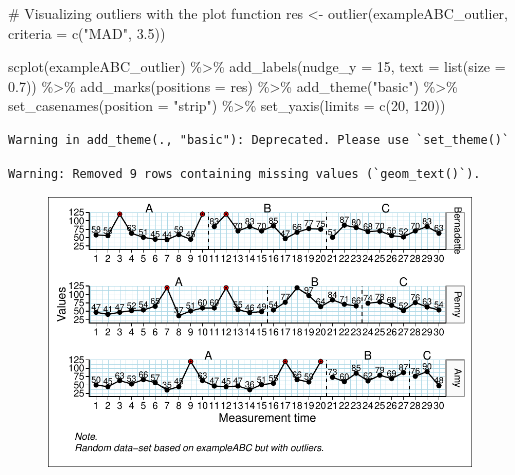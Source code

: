 \documentclass[
  letterpaper,
  DIV=11,
  numbers=noendperiod]{scrreprt}
\newenvironment{Shaded}{\begin{snugshade}}{\end{snugshade}}
\newcommand{\AttributeTok}[1]{\textcolor[rgb]{0.40,0.45,0.13}{#1}}
\newcommand{\CommentTok}[1]{\textcolor[rgb]{0.37,0.37,0.37}{#1}}
\newcommand{\DecValTok}[1]{\textcolor[rgb]{0.68,0.00,0.00}{#1}}
\newcommand{\FloatTok}[1]{\textcolor[rgb]{0.68,0.00,0.00}{#1}}
\newcommand{\FunctionTok}[1]{\textcolor[rgb]{0.28,0.35,0.67}{#1}}
\newcommand{\NormalTok}[1]{\textcolor[rgb]{0.00,0.23,0.31}{#1}}
\newcommand{\OtherTok}[1]{\textcolor[rgb]{0.00,0.23,0.31}{#1}}
\newcommand{\SpecialCharTok}[1]{\textcolor[rgb]{0.37,0.37,0.37}{#1}}
\newcommand{\StringTok}[1]{\textcolor[rgb]{0.13,0.47,0.30}{#1}}
\begin{document}
\begin{Shaded}
\begin{Highlighting}[]
\CommentTok{\# Visualizing outliers with the plot function}
\NormalTok{res }\OtherTok{\textless{}{-}} \FunctionTok{outlier}\NormalTok{(exampleABC\_outlier, }\AttributeTok{criteria =} \FunctionTok{c}\NormalTok{(}\StringTok{"MAD"}\NormalTok{, }\FloatTok{3.5}\NormalTok{))}

\FunctionTok{scplot}\NormalTok{(exampleABC\_outlier) }\SpecialCharTok{\%\textgreater{}\%}
  \FunctionTok{add\_labels}\NormalTok{(}\AttributeTok{nudge\_y =} \DecValTok{15}\NormalTok{, }\AttributeTok{text =} \FunctionTok{list}\NormalTok{(}\AttributeTok{size =} \FloatTok{0.7}\NormalTok{)) }\SpecialCharTok{\%\textgreater{}\%}
  \FunctionTok{add\_marks}\NormalTok{(}\AttributeTok{positions =}\NormalTok{ res) }\SpecialCharTok{\%\textgreater{}\%}
  \FunctionTok{add\_theme}\NormalTok{(}\StringTok{"basic"}\NormalTok{) }\SpecialCharTok{\%\textgreater{}\%}
  \FunctionTok{set\_casenames}\NormalTok{(}\AttributeTok{position =} \StringTok{"strip"}\NormalTok{) }\SpecialCharTok{\%\textgreater{}\%}
  \FunctionTok{set\_yaxis}\NormalTok{(}\AttributeTok{limits =} \FunctionTok{c}\NormalTok{(}\DecValTok{20}\NormalTok{, }\DecValTok{120}\NormalTok{))}
\end{Highlighting}
\end{Shaded}

\begin{verbatim}
Warning in add_theme(., "basic"): Deprecated. Please use `set_theme()`
\end{verbatim}

\begin{verbatim}
Warning: Removed 9 rows containing missing values (`geom_text()`).
\end{verbatim}

\begin{figure}[H]

{\centering \includegraphics{./ch_missing_values_outliers_files/figure-pdf/outlier-1.pdf}

}

\end{figure}
\end{document}
